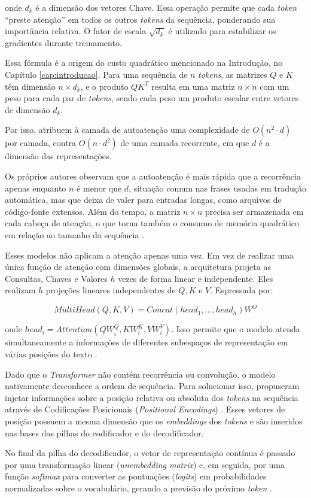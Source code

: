 \documentclass[
    12pt,                %
    openright,           %
    oneside,             %
    a4paper,             %
    english,             %
    brazil               %
]{abntex2}
\begin{document}
\par
onde $d_{k}$ é a dimensão dos vetores Chave. Essa operação permite que cada \textit{token} ``preste atenção'' em todos os outros \textit{tokens} da sequência, ponderando sua importância relativa.
O fator de escala $\sqrt{d_k}$ é utilizado para estabilizar os gradientes durante treinamento.
\par
Essa fórmula é a origem do custo quadrático mencionado na Introdução, no Capítulo \ref{cap:introducao}.
Para uma sequência de $n$ \textit{tokens}, as matrizes $Q$ e $K$ têm dimensão $n \times d_k$, e o produto $QK^T$ resulta em uma matriz $n \times n$ com um peso para cada par de \textit{tokens}, sendo cada peso um produto escalar entre vetores de dimensão $d_k$.
\par
Por isso,  atribuem à camada de autoatenção uma complexidade de $O(n^2 \cdot d)$ por camada, contra $O(n \cdot d^2)$ de uma camada recorrente, em que $d$ é a dimensão das representações.
\par
Os próprios autores observam que a autoatenção é mais rápida que a recorrência apenas enquanto $n$ é menor que $d$, situação comum nas frases usadas em tradução automática, mas que deixa de valer para entradas longas, como arquivos de código-fonte extensos.
Além do tempo, a matriz $n \times n$ precisa ser armazenada em cada cabeça de atenção, o que torna também o consumo de memória quadrático em relação ao tamanho da sequência \cite{dao2022flashattention}.
\par
Esses modelos não aplicam a atenção apenas uma vez.
Em vez de realizar uma única função de atenção com dimensões globais, a arquitetura projeta as Consultas, Chaves e Valores $h$ vezes de forma linear e independente.
Eles realizam $h$ projeções lineares independentes de $Q, K$ e $V$.
Espressada por:

\begin{equation}
  MultiHead(Q, K, V) = Concat(head_1, ..., head_h) W^O
\end{equation}

onde $head_i = Attention(QW^{Q}_i, KW^{K}_i,VW^{V}_i)$.
Isso permite que o modelo atenda simultaneamente a informações de diferentes subespaços de representação em várias posições do texto \cite{vaswani2017attention}.
\par
Dado que o \textit{Transformer} não contém recorrência ou convolução, o modelo nativamente desconhece a ordem de sequência.
Para solucionar isso,  propuseram injetar informações sobre a posição relativa ou absoluta dos \textit{tokens} na sequência através de Codificações Posicionais (\textit{Positional Encodings}) \cite{vaswani2017attention}.
Esses vetores de posição possuem a mesma dimensão que os \textit{embeddings} dos \textit{tokens} e são inseridos nas bases das pilhas do codificador e do decodificador.
\par
No final da pilha do decodificador, o vetor de representação contínua é passado por uma transformação linear (\textit{unembedding matrix}) e, em seguida, por uma função \textit{softmax} para converter as pontuações (\textit{logits}) em probabilidades normalizadas sobre o vocabulário, gerando a previsão do próximo \textit{token} \cite{vaswani2017attention}.
\end{document}
